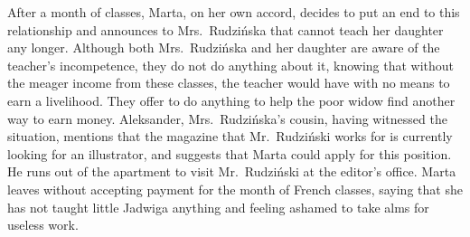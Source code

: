 After a month of classes, Marta, on her own accord, decides to put an end to this relationship and announces to Mrs.\ Rudzińska that cannot teach her daughter any longer.
Although both Mrs.\ Rudzińska and her daughter are aware of the teacher's incompetence, they do not do anything about it, knowing that without the meager income from these classes, the teacher would have with no means to earn a livelihood.
They offer to do anything to help the poor widow find another way to earn money.
Aleksander, Mrs.\ Rudzińska's cousin, having witnessed the situation, mentions that the magazine that Mr.\ Rudziński works for is currently looking for an illustrator, and suggests that Marta could apply for this position.
He runs out of the apartment to visit Mr.\ Rudziński at the editor's office.
Marta leaves without accepting payment for the month of French classes, saying that she has not taught little Jadwiga anything and feeling ashamed to take alms for useless work.
